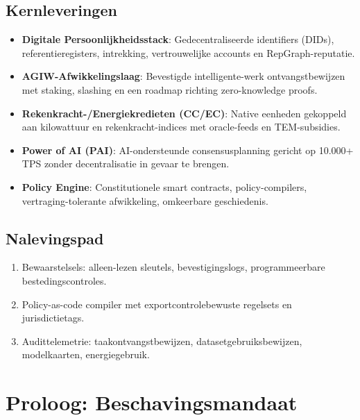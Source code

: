 \documentclass[11pt]{article}
\begin{document}
\subsection{Kernleveringen}
\begin{itemize}[noitemsep]
  \item \textbf{Digitale Persoonlijkheidsstack}: Gedecentraliseerde identifiers (DIDs), referentieregisters, intrekking, vertrouwelijke accounts en RepGraph-reputatie.
  \item \textbf{AGIW-Afwikkelingslaag}: Bevestigde intelligente-werk ontvangstbewijzen met staking, slashing en een roadmap richting zero-knowledge proofs.
  \item \textbf{Rekenkracht-/Energiekredieten (CC/EC)}: Native eenheden gekoppeld aan kilowattuur en rekenkracht-indices met oracle-feeds en TEM-subsidies.
  \item \textbf{Power of AI (PAI)}: AI-ondersteunde consensusplanning gericht op 10.000+ TPS zonder decentralisatie in gevaar te brengen.
  \item \textbf{Policy Engine}: Constitutionele smart contracts, policy-compilers, vertraging-tolerante afwikkeling, omkeerbare geschiedenis.
\end{itemize}

\subsection{Nalevingspad}
\begin{enumerate}[noitemsep]
  \item Bewaarstelsels: alleen-lezen sleutels, bevestigingslogs, programmeerbare bestedingscontroles.
  \item Policy-as-code compiler met exportcontrolebewuste regelsets en jurisdictietags.
  \item Audittelemetrie: taakontvangstbewijzen, datasetgebruiksbewijzen, modelkaarten, energiegebruik.
\end{enumerate}

\section{Proloog: Beschavingsmandaat}
\end{document}

